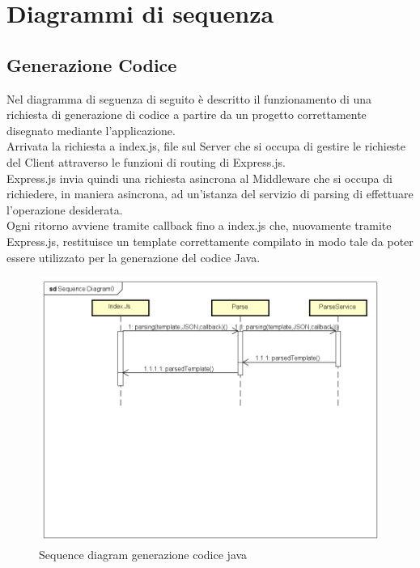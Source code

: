 \section{Diagrammi di sequenza}

	\subsection{Generazione Codice}
		Nel diagramma di seguenza di seguito è descritto il funzionamento di una richiesta di generazione di codice
		a partire da un progetto correttamente disegnato mediante l'applicazione.\\
		Arrivata la richiesta a index.js, file sul Server che si occupa di gestire le richieste del Client attraverso
		le funzioni di routing di Express.js.\\
		Express.js invia quindi una richiesta asincrona al Middleware che si occupa di richiedere, in maniera asincrona,
		ad un'istanza del servizio di parsing di effettuare l'operazione desiderata.\\
		Ogni ritorno avviene tramite callback fino a index.js che, nuovamente tramite Express.js, restituisce un template correttamente compilato
		in modo tale da poter essere utilizzato per la generazione del codice Java.
		\begin{figure}[h!]
			\centering
			\includegraphics[scale=0.5]{Sequence/generazioneJava.png}
			\caption{Sequence diagram generazione codice java}
		\end{figure}

